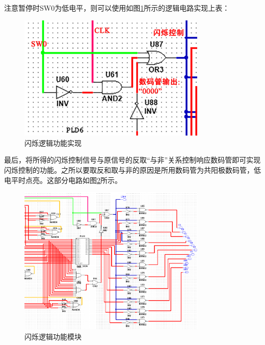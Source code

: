 \documentclass[UTF8]{ctexart}
\numberwithin{figure}{subsection}
\numberwithin{table}{subsection}
\numberwithin{equation}{subsection}
\begin{document}
\par 注意暂停时SW0为低电平，则可以使用如图\ref{spark logic circuit}所示的逻辑电路实现上表：
\begin{figure}[H]
    \begin{center}
        \includegraphics[width=0.8\textwidth]{watch/spark logic circuit.jpg}
    \end{center}
    \caption{闪烁逻辑功能实现}
    \label{spark logic circuit}
\end{figure}

\par 最后，将所得的闪烁控制信号与原信号的反取“与非”关系控制响应数码管即可实现闪烁控制的功能。之所以要取反和取与非的原因是所用数码管为共阳极数码管，低电平时点亮。这部分电路如图\ref{watch right}所示。

\begin{figure}[H]
    \begin{center}
        \includegraphics[width=0.8\textwidth]{watch/right half.png}
    \end{center}
    \caption{闪烁逻辑功能模块}
    \label{watch right}
\end{figure}
\end{document}
